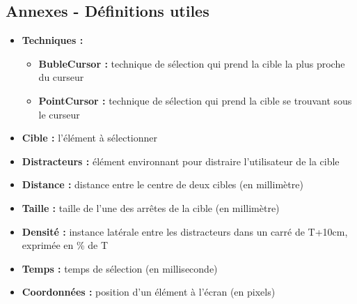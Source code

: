 \subsection*{Annexes - Définitions utiles}

\begin{itemize}
    \item \textbf{Techniques :}
    \begin{itemize}
        \item \textbf{BubleCursor :} technique de sélection qui prend la cible la plus proche du curseur
        \item \textbf{PointCursor :} technique de sélection qui prend la cible se trouvant sous le curseur
    \end{itemize}
    \item \textbf{Cible :} l'élément à sélectionner
    \item \textbf{Distracteurs :} élément environnant pour distraire l'utilisateur de la cible
    \item \textbf{Distance :} distance entre le centre de deux cibles (en millimètre)
    \item \textbf{Taille :} taille de l'une des arrêtes de la cible (en millimètre)
    \item \textbf{Densité :} instance latérale entre les distracteurs
    dans un carré de T+10cm, exprimée en \% de T
    \item \textbf{Temps :} temps de sélection (en milliseconde)
    \item \textbf{Coordonnées :} position d'un élément à l'écran (en pixels)
\end{itemize}